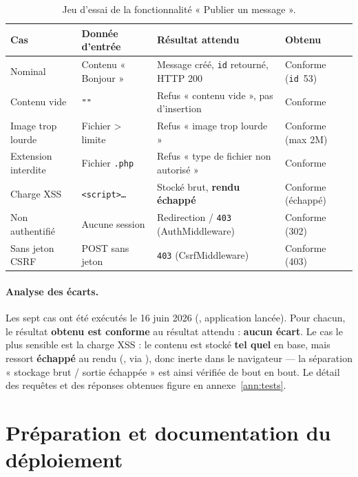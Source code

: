 \begin{table}[ht]
\centering
\renewcommand{\arraystretch}{1.3}
\small
\begin{tabularx}{\textwidth}{@{}L{2.6cm} L{3.2cm} X L{2.2cm}@{}}
\toprule
\textbf{Cas} & \textbf{Donnée d'entrée} & \textbf{Résultat attendu} & \textbf{Obtenu} \\
\midrule
Nominal & Contenu « Bonjour » & Message créé, \texttt{id} retourné, HTTP 200 & Conforme (\texttt{id}~53) \\
Contenu vide & \texttt{""} & Refus « contenu vide », pas d'insertion & Conforme \\
Image trop lourde & Fichier > limite & Refus « image trop lourde » & Conforme (max 2M) \\
Extension interdite & Fichier \texttt{.php} & Refus « type de fichier non autorisé » & Conforme \\
Charge XSS & \texttt{<script>\dots} & Stocké brut, \textbf{rendu échappé} & Conforme (échappé) \\
Non authentifié & Aucune session & Redirection / \texttt{403} (AuthMiddleware) & Conforme (302) \\
Sans jeton CSRF & POST sans jeton & \texttt{403} (CsrfMiddleware) & Conforme (403) \\
\bottomrule
\end{tabularx}
\caption{Jeu d'essai de la fonctionnalité « Publier un message ».}
\label{tab:jeuessai}
\end{table}

\paragraph{Analyse des écarts.} Les sept cas ont été exécutés le 16 juin 2026 (,
application lancée). Pour chacun, le résultat \textbf{obtenu est conforme} au résultat attendu :
\textbf{aucun écart}. Le cas le plus sensible est la charge XSS : le contenu  est
stocké \textbf{tel quel} en base, mais ressort \textbf{échappé} au rendu (,
via ), donc inerte dans le navigateur — la séparation « stockage brut / sortie
échappée » est ainsi vérifiée de bout en bout. Le détail des requêtes et des réponses obtenues
figure en annexe~\ref{ann:tests}.

\section{Préparation et documentation du déploiement}
\label{sec:deploiement}

